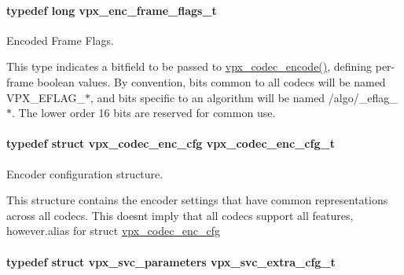 \paragraph[{\texorpdfstring{vpx\+\_\+enc\+\_\+frame\+\_\+flags\+\_\+t}{vpx_enc_frame_flags_t}}]{\setlength{\rightskip}{0pt plus 5cm}typedef long {\bf vpx\+\_\+enc\+\_\+frame\+\_\+flags\+\_\+t}}\hypertarget{group__encoder_ga99e4a3c966f0de19fe1aa626bd860366}{}\label{group__encoder_ga99e4a3c966f0de19fe1aa626bd860366}


Encoded Frame Flags. 

This type indicates a bitfield to be passed to \hyperlink{group__encoder_gaf990542e2aeb389f05fae3e9c7803639}{vpx\+\_\+codec\+\_\+encode()}, defining per-\/frame boolean values. By convention, bits common to all codecs will be named V\+P\+X\+\_\+\+E\+F\+L\+A\+G\+\_\+$\ast$, and bits specific to an algorithm will be named /algo/\+\_\+eflag\+\_\+$\ast$. The lower order 16 bits are reserved for common use. 
\paragraph[{\texorpdfstring{vpx\+\_\+codec\+\_\+enc\+\_\+cfg\+\_\+t}{vpx_codec_enc_cfg_t}}]{\setlength{\rightskip}{0pt plus 5cm}typedef struct {\bf vpx\+\_\+codec\+\_\+enc\+\_\+cfg}  {\bf vpx\+\_\+codec\+\_\+enc\+\_\+cfg\+\_\+t}}\hypertarget{group__encoder_ga946236c809e493b31a815d82db1e59db}{}\label{group__encoder_ga946236c809e493b31a815d82db1e59db}


Encoder configuration structure. 

This structure contains the encoder settings that have common representations across all codecs. This doesn\textquotesingle{}t imply that all codecs support all features, however.\+alias for struct \hyperlink{structvpx__codec__enc__cfg}{vpx\+\_\+codec\+\_\+enc\+\_\+cfg} 
\paragraph[{\texorpdfstring{vpx\+\_\+svc\+\_\+extra\+\_\+cfg\+\_\+t}{vpx_svc_extra_cfg_t}}]{\setlength{\rightskip}{0pt plus 5cm}typedef struct {\bf vpx\+\_\+svc\+\_\+parameters}  {\bf vpx\+\_\+svc\+\_\+extra\+\_\+cfg\+\_\+t}}\hypertarget{group__encoder_gaa7648cca6bd9745ea80ffb67c32d39ea}{}\label{group__encoder_gaa7648cca6bd9745ea80ffb67c32d39ea}


